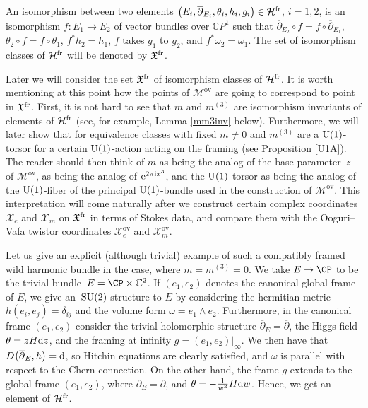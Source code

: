 \begin{Definition} An isomorphism between two elements $\bigl(E_i,\overline{\partial}_{E_i},\theta_i,h_i,g_i\bigr)\in \mathcal{H}^{{\rm fr}}$, $i=1,2$, is an isomorphism $f\colon E_1\to E_2$ of vector bundles over $\mathbb{C}P^1$ such that $\overline{\partial}_{E_2}\circ f=f\circ \overline{\partial}_{E_1}$, $\theta_2\circ f=f\circ \theta_1$, $f^*h_2=h_1$, $f$ takes $g_1$ to $g_2$, and $f^*\omega_{2}=\omega_{1}$. The set of isomorphism classes of $\mathcal{H}^{{\rm fr}}$ will be denoted by $\mathfrak{X}^{{\rm fr}}$.
\end{Definition}
\begin{Remark}
Later we will consider the set $\mathfrak{X}^{{\rm fr}}$ of isomorphism classes of $\mathcal{H}^{{\rm fr}}$. It is worth mentioning at this point how the points of $\mathcal{M}^{\text{ov}}$ are going to correspond to point in $\mathfrak{X}^{{\rm fr}}$. First, it is not hard to see that $m$ and $m^{(3)}$ are isomorphism invariants of elements of $\mathcal{H}^{{\rm fr}}$ (see, for example, Lemma \ref{mm3inv} below). Furthermore, we will later show that for equivalence classes with fixed $m\neq 0$ and $m^{(3)}$ are a ${\rm U}(1)$-torsor for a certain ${\rm U}(1)$-action acting on the framing (see Proposition \ref{U1A}). The reader should then think of $m$ as being the analog of the base parameter~$z$ of $\mathcal{M}^{\text{ov}}$,  as being the analog of ${\rm e}^{2\pi {\rm i}x^3}$, and the ${\rm U}(1)$-torsor as being the analog of the ${\rm U}(1)$-fiber of the principal ${\rm U}(1)$-bundle used in the construction of $\mathcal{M}^{\text{ov}}$. This interpretation will come naturally after we construct certain complex coordinates $\mathcal{X}_e$ and $\mathcal{X}_m$ on $\mathfrak{X}^{{\rm fr}}$ in terms of Stokes data, and compare them with the Ooguri--Vafa twistor coordinates $\mathcal{X}_e^{\text{ov}}$ and $\mathcal{X}_m^{\text{ov}}$.
\end{Remark}

\begin{Example}\label{trivWHB} Let us give an explicit (although trivial) example of such a compatibly framed wild harmonic bundle in the case, where $m=m^{(3)}=0$. We take $E\to \CP$ to be the trivial bundle~${E=\CP \times \mathbb{C}^2}$. If $(e_1,e_2)$ denotes the canonical global frame of $E$, we give an~${\rm SU}(2)$ structure to $E$ by considering the hermitian metric $h(e_i,e_j)=\delta_{ij}$ and the volume form ${\omega=e_1\wedge e_2}$. Furthermore, in the canonical frame $(e_1,e_2)$ consider the trivial holomorphic structure $\overline{\partial}_E=\overline{\partial}$, the Higgs field $\theta=zH{\rm d}z$, and the framing at infinity $g=(e_1,e_2)|_{\infty}$. We then have that~$D\bigl(\overline{\partial}_E,h\bigr)={\rm d}$, so Hitchin equations are clearly satisfied, and $\omega$ is parallel with respect to the Chern connection. On the other hand,
the frame $g$ extends to the global frame $(e_1,e_2)$, where $\overline{\partial}_E=\overline{\partial}$, and $\theta=-\frac{1}{w^3}H{\rm d}w$. Hence, we get an element of $\mathcal{H}^{{\rm fr}}$.
\end{Example}

